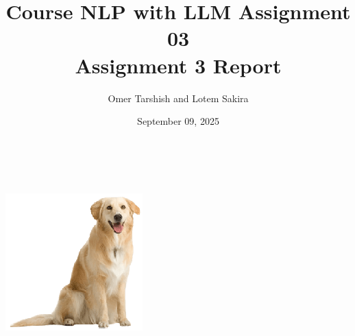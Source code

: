 \title{\large Course NLP with LLM Assignment 03\\[0.5cm]
        \bf\Large Assignment 3 Report}
\author{\large Omer Tarshish and Lotem Sakira}
\date{September 09, 2025}
\makeatletter
    \begin{titlepage}
        \begin{center}
        \vbox{}\vspace{5cm}
            {\@title }\\[3cm] 
            {\@author}\\
            \vfill \includegraphics[scale=0.3]{images/logo.png}\\[1cm]
            {\@date}
        \end{center}
    \end{titlepage}
\makeatother
